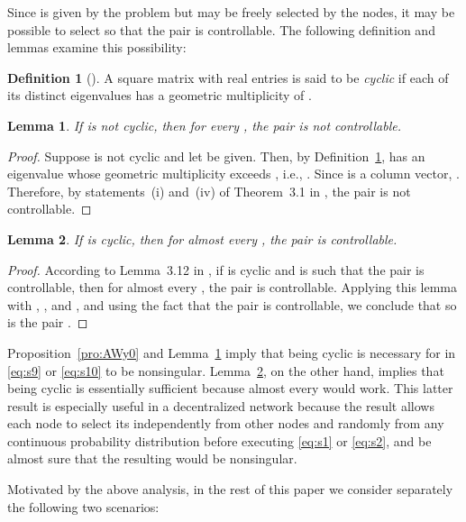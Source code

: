 \documentclass[11pt]{article}
\theoremstyle{plain}
\newtheorem{lemma}{Lemma}
\theoremstyle{definition}
\newtheorem{definition}{Definition}
\theoremstyle{remark}
\begin{document}
Since  is given by the problem but  may be freely selected by the nodes, it may be possible to select  so that the pair  is controllable. The following definition and lemmas examine this possibility:

\begin{definition}[\!\!\cite{ZhouK96}]\label{def:cyc}
A square matrix with real entries is said to be {\em cyclic} if each of its distinct eigenvalues has a geometric multiplicity of .
\end{definition}

\begin{lemma}\label{lem:Wnotcyc}
If  is not cyclic, then for every , the pair  is not controllable.
\end{lemma}

\begin{proof}
Suppose  is not cyclic and let  be given. Then, by Definition~\ref{def:cyc},  has an eigenvalue  whose geometric multiplicity exceeds , i.e., . Since  is a column vector, . Therefore, by statements~(i) and~(iv) of Theorem~3.1 in \cite{ZhouK96}, the pair  is not controllable.
\end{proof}

\begin{lemma}\label{lem:Wcyc}
If  is cyclic, then for almost every , the pair  is controllable.
\end{lemma}

\begin{proof}
According to Lemma~3.12 in \cite{ZhouK96}, if  is cyclic and  is such that the pair  is controllable, then for almost every , the pair  is controllable. Applying this lemma with , , and , and using the fact that the pair  is controllable, we conclude that so is the pair .
\end{proof}

Proposition~\ref{pro:AWy0} and Lemma~\ref{lem:Wnotcyc} imply that  being cyclic is necessary for  in \eqref{eq:s9} or \eqref{eq:s10} to be nonsingular. Lemma~\ref{lem:Wcyc}, on the other hand, implies that  being cyclic is essentially sufficient because almost every  would work. This latter result is especially useful in a decentralized network because the result allows each node  to select its  independently from other nodes and randomly from any continuous probability distribution before executing \eqref{eq:s1} or \eqref{eq:s2}, and be almost sure that the resulting  would be nonsingular.

Motivated by the above analysis, in the rest of this paper we consider separately the following two scenarios:
\end{document}
